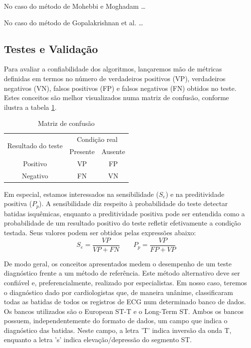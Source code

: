 No caso do método de Mohebbi e Moghadam \ldots

No caso do método de Gopalakrishnan et al. \ldots

\subsection{Testes e Validação}
Para avaliar a confiabilidade dos algoritmos, lançaremos mão de métricas definidas em termos no número de verdadeiros positivos (VP), verdadeiros negativos (VN), falsos positivos (FP) e falsos negativos (FN) obtidos no teste. Estes conceitos são melhor visualizados numa matriz de confusão, conforme ilustra a tabela \ref{tab:confusion_matrix}.

\begin{table}[ht] 
    \caption{Matriz de confusão}
    \centering
    \begin{tabular}{ccc}
        \toprule
        \multirow{2}{2cm}{Resultado do teste} &
        \multicolumn{2}{c}{Condição real} \\
        \cmidrule{2-3}
        & Presente & Ausente \\ 
        \midrule
        Positivo & VP & FP \\
        \midrule
        Negativo & FN & VN \\
        \bottomrule
    \end{tabular} 
    \label{tab:confusion_matrix}
\end{table} 

Em especial, estamos interessados na sensibilidade ($S_e$) e na preditividade positiva ($P_p$). A sensibilidade diz respeito à probabilidade do teste detectar batidas isquêmicas, enquanto a preditividade positiva pode ser entendida como a probabilidade de um resultado positivo do teste refletir efetivamente a condição testada. Seus valores podem ser obtidos pelas expressões abaixo:
\begin{equation} \label{equ:metrics}
    S_e = \frac{VP}{VP+FN}
    \quad\quad
    P_p = \frac{VP}{FP+VP}
\end{equation}

De modo geral, os conceitos apresentados medem o desempenho de um teste diagnóstico frente a um método de referência. Este método alternativo deve ser confiável e, preferencialmente, realizado por especialistas. Em nosso caso, teremos o diagnóstico dado por cardiologistas que, de maneira unânime, classificaram todas as batidas de todos os registros de ECG num determinado banco de dados. Os bancos utilizados são o European ST-T e o Long-Term ST. Ambos os bancos possuem, independentemente do formato de dados, um campo que indica o diagnóstico das batidas. Neste campo, a letra 'T' indica inversão da onda T, enquanto a letra 's' indica elevação/depressão do segmento ST.

